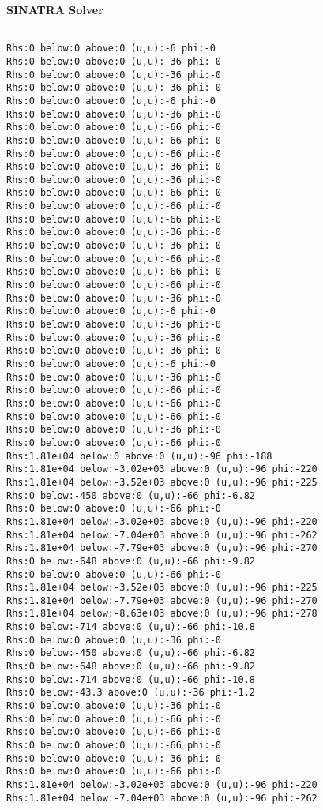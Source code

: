 \textbf{SINATRA Solver}
\begin{verbatim}

Rhs:0 below:0 above:0 (u,u):-6 phi:-0
Rhs:0 below:0 above:0 (u,u):-36 phi:-0
Rhs:0 below:0 above:0 (u,u):-36 phi:-0
Rhs:0 below:0 above:0 (u,u):-36 phi:-0
Rhs:0 below:0 above:0 (u,u):-6 phi:-0
Rhs:0 below:0 above:0 (u,u):-36 phi:-0
Rhs:0 below:0 above:0 (u,u):-66 phi:-0
Rhs:0 below:0 above:0 (u,u):-66 phi:-0
Rhs:0 below:0 above:0 (u,u):-66 phi:-0
Rhs:0 below:0 above:0 (u,u):-36 phi:-0
Rhs:0 below:0 above:0 (u,u):-36 phi:-0
Rhs:0 below:0 above:0 (u,u):-66 phi:-0
Rhs:0 below:0 above:0 (u,u):-66 phi:-0
Rhs:0 below:0 above:0 (u,u):-66 phi:-0
Rhs:0 below:0 above:0 (u,u):-36 phi:-0
Rhs:0 below:0 above:0 (u,u):-36 phi:-0
Rhs:0 below:0 above:0 (u,u):-66 phi:-0
Rhs:0 below:0 above:0 (u,u):-66 phi:-0
Rhs:0 below:0 above:0 (u,u):-66 phi:-0
Rhs:0 below:0 above:0 (u,u):-36 phi:-0
Rhs:0 below:0 above:0 (u,u):-6 phi:-0
Rhs:0 below:0 above:0 (u,u):-36 phi:-0
Rhs:0 below:0 above:0 (u,u):-36 phi:-0
Rhs:0 below:0 above:0 (u,u):-36 phi:-0
Rhs:0 below:0 above:0 (u,u):-6 phi:-0
Rhs:0 below:0 above:0 (u,u):-36 phi:-0
Rhs:0 below:0 above:0 (u,u):-66 phi:-0
Rhs:0 below:0 above:0 (u,u):-66 phi:-0
Rhs:0 below:0 above:0 (u,u):-66 phi:-0
Rhs:0 below:0 above:0 (u,u):-36 phi:-0
Rhs:0 below:0 above:0 (u,u):-66 phi:-0
Rhs:1.81e+04 below:0 above:0 (u,u):-96 phi:-188
Rhs:1.81e+04 below:-3.02e+03 above:0 (u,u):-96 phi:-220
Rhs:1.81e+04 below:-3.52e+03 above:0 (u,u):-96 phi:-225
Rhs:0 below:-450 above:0 (u,u):-66 phi:-6.82
Rhs:0 below:0 above:0 (u,u):-66 phi:-0
Rhs:1.81e+04 below:-3.02e+03 above:0 (u,u):-96 phi:-220
Rhs:1.81e+04 below:-7.04e+03 above:0 (u,u):-96 phi:-262
Rhs:1.81e+04 below:-7.79e+03 above:0 (u,u):-96 phi:-270
Rhs:0 below:-648 above:0 (u,u):-66 phi:-9.82
Rhs:0 below:0 above:0 (u,u):-66 phi:-0
Rhs:1.81e+04 below:-3.52e+03 above:0 (u,u):-96 phi:-225
Rhs:1.81e+04 below:-7.79e+03 above:0 (u,u):-96 phi:-270
Rhs:1.81e+04 below:-8.63e+03 above:0 (u,u):-96 phi:-278
Rhs:0 below:-714 above:0 (u,u):-66 phi:-10.8
Rhs:0 below:0 above:0 (u,u):-36 phi:-0
Rhs:0 below:-450 above:0 (u,u):-66 phi:-6.82
Rhs:0 below:-648 above:0 (u,u):-66 phi:-9.82
Rhs:0 below:-714 above:0 (u,u):-66 phi:-10.8
Rhs:0 below:-43.3 above:0 (u,u):-36 phi:-1.2
Rhs:0 below:0 above:0 (u,u):-36 phi:-0
Rhs:0 below:0 above:0 (u,u):-66 phi:-0
Rhs:0 below:0 above:0 (u,u):-66 phi:-0
Rhs:0 below:0 above:0 (u,u):-66 phi:-0
Rhs:0 below:0 above:0 (u,u):-36 phi:-0
Rhs:0 below:0 above:0 (u,u):-66 phi:-0
Rhs:1.81e+04 below:-3.02e+03 above:0 (u,u):-96 phi:-220
Rhs:1.81e+04 below:-7.04e+03 above:0 (u,u):-96 phi:-262

\end{verbatim}
